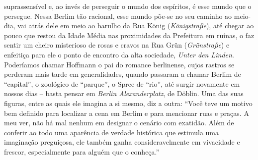 suprassensível e, ao invés de perseguir o mundo dos espíritos, é esse
mundo que o persegue. Nessa Berlim tão racional, esse mundo põe-se no
seu caminho ao meio-dia, vai atrás dele em meio ao barulho da Rua König
(\emph{Königstraße}), até chegar ao pouco que restou da Idade Média nas
proximidades da Prefeitura em ruínas, o faz sentir um cheiro misterioso
de rosas e cravos na Rua Grün (\emph{Grünstraße}) e enfeitiça para ele o
ponto de encontro da alta sociedade, \emph{Unter den Linden}. Poderíamos
chamar Hoffmann o pai do romance berlinense, cujos rastros se perderam
mais tarde em generalidades, quando passaram a chamar Berlim de
``capital'', o zoológico de ``parque'', o Spree de ``rio'', até surgir
novamente em nossos dias -- basta pensar em \emph{Berlin
Alexanderplatz}, de Döblin. Uma das suas figuras, entre as quais ele
imagina a si mesmo, diz a outra: ``Você teve um motivo bem definido para
localizar a cena em Berlim e para mencionar ruas e praças. A meu ver,
não há mal nenhum em designar o cenário com exatidão. Além de conferir
ao todo uma aparência de verdade histórica que estimula uma imaginação
preguiçosa, ele também ganha consideravelmente em vivacidade e frescor,
especialmente para alguém que o conheça.''


